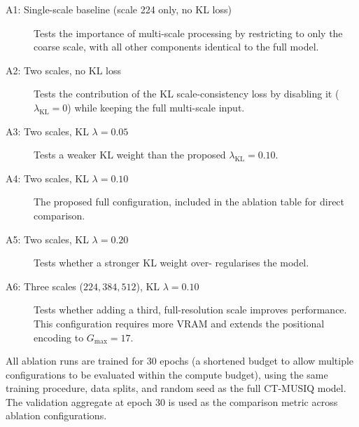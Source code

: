 \begin{description}
    \item[A1: Single-scale baseline (scale 224 only, no KL loss)] Tests the importance
    of multi-scale processing by restricting to only the coarse scale, with all other
    components identical to the full model.

    \item[A2: Two scales, no KL loss] Tests the contribution of the KL scale-consistency
    loss by disabling it ($\lambda_{\text{KL}} = 0$) while keeping the full multi-scale
    input.

    \item[A3: Two scales, KL $\lambda = 0.05$] Tests a weaker KL weight than the
    proposed $\lambda_{\text{KL}} = 0.10$.

    \item[A4: Two scales, KL $\lambda = 0.10$] The proposed full configuration, included
    in the ablation table for direct comparison.

    \item[A5: Two scales, KL $\lambda = 0.20$] Tests whether a stronger KL weight over-
    regularises the model.

    \item[A6: Three scales ($224, 384, 512$), KL $\lambda = 0.10$] Tests whether adding
    a third, full-resolution scale improves performance. This configuration requires more
    VRAM and extends the positional encoding to $G_{\max} = 17$.
\end{description}

All ablation runs are trained for 30 epochs (a shortened budget to allow multiple
configurations to be evaluated within the compute budget), using the same training
procedure, data splits, and random seed as the full CT-MUSIQ model. The validation
aggregate at epoch 30 is used as the comparison metric across ablation configurations.
